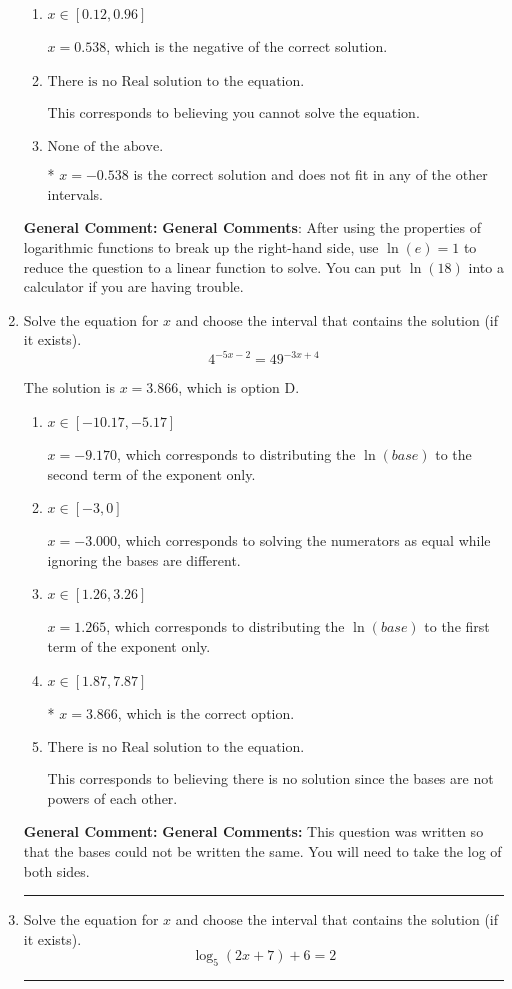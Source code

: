\documentclass{extbook}[14pt]
\newcommand{\litem}[1]{\item #1

\rule{\textwidth}{0.4pt}}
\begin{document}
\begin{enumerate}
{\begin{enumerate}[label=\Alph*.]
$x = -0.238$, which corresponds to treating any root as a square root.
\item \( x \in [0.12, 0.96] \)

$x = 0.538$, which is the negative of the correct solution.
\item \( \text{There is no Real solution to the equation.} \)

This corresponds to believing you cannot solve the equation.
\item \( \text{None of the above.} \)

* $x = -0.538$ is the correct solution and does not fit in any of the other intervals.
\end{enumerate}

\textbf{General Comment:} \textbf{General Comments}: After using the properties of logarithmic functions to break up the right-hand side, use $\ln(e) = 1$ to reduce the question to a linear function to solve. You can put $\ln(18)$ into a calculator if you are having trouble.
}
\litem{
Solve the equation for $x$ and choose the interval that contains the solution (if it exists).
\[ 4^{-5x-2} = 49^{-3x+4} \]

The solution is \( x = 3.866 \), which is option D.\begin{enumerate}[label=\Alph*.]
\item \( x \in [-10.17, -5.17] \)

$x = -9.170$, which corresponds to distributing the $\ln(base)$ to the second term of the exponent only.
\item \( x \in [-3, 0] \)

$x = -3.000$, which corresponds to solving the numerators as equal while ignoring the bases are different.
\item \( x \in [1.26, 3.26] \)

$x = 1.265$, which corresponds to distributing the $\ln(base)$ to the first term of the exponent only.
\item \( x \in [1.87, 7.87] \)

* $x = 3.866$, which is the correct option.
\item \( \text{There is no Real solution to the equation.} \)

This corresponds to believing there is no solution since the bases are not powers of each other.
\end{enumerate}

\textbf{General Comment:} \textbf{General Comments:} This question was written so that the bases could not be written the same. You will need to take the log of both sides.
}
\litem{
Solve the equation for $x$ and choose the interval that contains the solution (if it exists).
\[ \log_{5}{(2x+7)}+6 = 2 \]

}
\end{enumerate}
\end{document}
